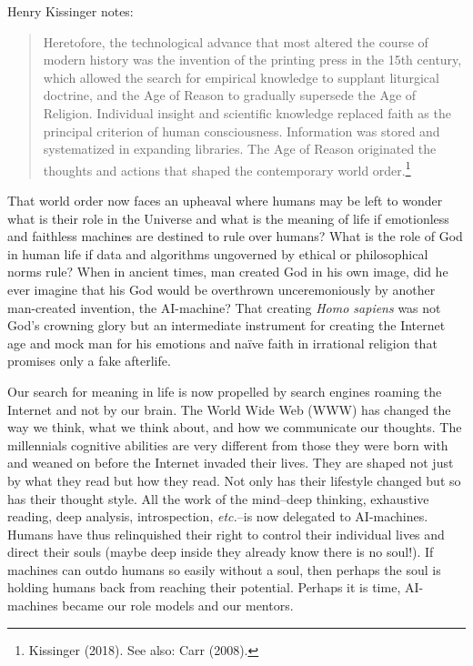 \begin{multicols}{2}
\vskip 3pt

Henry Kissinger notes:

\begin{quote}
Heretofore, the technological advance that most altered the course of modern history was the invention of the printing press in the 15th century, which allowed the search for empirical knowledge to supplant liturgical doctrine, and the Age of Reason to gradually supersede the Age of Religion. Individual insight and scientific knowledge replaced faith as the principal criterion of human consciousness. Information was stored and systematized in expanding libraries. The Age of Reason originated the thoughts and actions that shaped the contemporary world order.\footnote{Kissinger (2018). See also: Carr (2008).}
\end{quote}

\vskip 3pt

That world order now faces an upheaval where humans may be left to wonder what is their role in the Universe and what is the meaning of life if emotionless and faithless machines are destined to rule over humans? What is the role of God in human life if data and algorithms ungoverned by ethical or philosophical norms rule? When in ancient times, man created God in his own image, did he ever imagine that his God would be overthrown unceremoniously by another man-created invention, the AI-machine? That creating \textit{Homo sapiens} was not God's crowning glory but an intermediate
instrument for creating the Internet age and mock man for his emotions and naïve faith in irrational religion that promises only a fake afterlife.

\vskip 3pt

Our search for meaning in life is now propelled by search engines roaming the Internet and not by our brain. The World Wide Web (WWW) has changed the way we think, what we think about, and how we communicate our thoughts. The millennials cognitive abilities are very different from those they were born with and weaned on before the Internet invaded their lives. They are shaped not just by what they read but how they read. Not only has their lifestyle changed but so has their thought style. All the work of the mind--deep thinking, exhaustive reading, deep analysis, introspection, \textit{etc.}--is now delegated to AI-machines. Humans have thus relinquished their right to control their individual lives and direct their souls (maybe deep inside they already know there is no soul!). If machines can outdo humans so easily without a soul, then perhaps the soul is holding humans back from reaching their potential. Perhaps it is time, AI-machines became our role models and our mentors.


\end{multicols}
